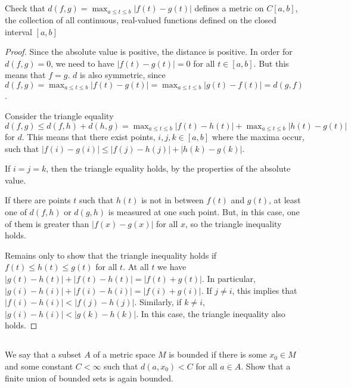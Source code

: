 
\subsection{} Check that $d(f, g) = \max_{a \leq t  \leq b} |f(t) -g(t)|$ defines a metric on $C[ a, b ]$, the collection of all continuous, real-valued functions defined on the closed interval $[a, b ]$

\begin{proof}
Since the absolute value is positive, the distance is positive. In order for $d(f,g) = 0$, we need to have $|f(t) - g(t)| = 0$ for all $t \in [a,b]$. But this means that $f=g$. $d$ is also symmetric, since $d(f, g) = \max_{a \leq t  \leq b} |f(t) -g(t)| = \max_{a \leq t  \leq b} |g(t) -f(t)| = d(g,f)$.

Consider the triangle equality $d(f,g) \leq d(f,h) + d(h,g) = \max_{a \leq t  \leq b} |f(t) -h(t)| + \max_{a \leq t  \leq b} |h(t) -g(t)|$
 for $d$. This means that there exist points, $i,j,k \in [a,b]$ where the maxima occur, such that $|f(i) - g(i)| \leq |f(j) -h(j)| +  |h(k) -g(k)|$.
 
 If $i=j=k$, then the triangle equality holds, by the properties of the absolute value.
 
 If there are points $t$ such that $h(t)$ is not in between $f(t)$ and $g(t)$, at least one of $d(f,h)$ or $d(g,h)$ is measured at one such point. But, in this case, one of them is greater than $|f(x) - g(x)|$ for all $x$, so the triangle inequality holds.
 
 Remains only to show that the triangle inequality holds if $f(t) \leq h(t) \leq g(t)$ for all $t$. At all $t$ we have $|g(t) - h(t)| + |f(t) - h(t)| = |f(t) + g(t)|$. In particular, $|g(i) - h(i)| + |f(i) - h(i)| = |f(i) + g(i)|$. If $j \neq i$, this implies that $|f(i) - h(i)| < |f(j) - h(j)|$. Similarly, if $k \neq i$, $|g(i) - h(i)| < |g(k) - h(k)|$. In this case, the triangle inequality also holds.
 
\end{proof}


\subsection{} We say that a subset $A$ of a metric space $M$ is bounded if there is some $x_0 \in M$ and some constant $C < \infty$ such that $d(a, x_0) < C$ for all $a \in A$. Show that a finite union of bounded sets is again bounded.

